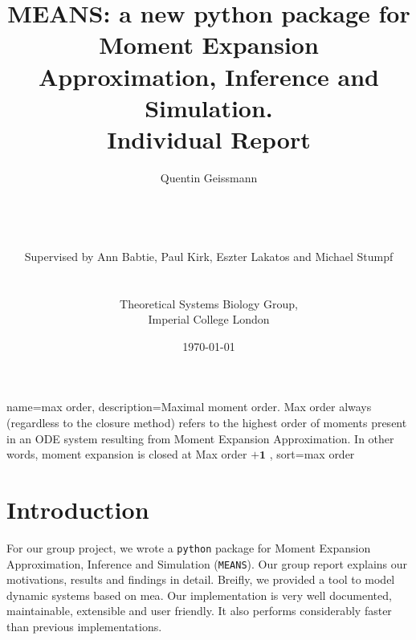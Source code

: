 \documentclass[11pt,a4paper]{article}
\newcommand{\means}{\texttt{MEANS}}
\newcommand{\py}{\texttt{python}}
\begin{document}
\listoftodos
\newpage

\title{MEANS: a new python package for Moment Expansion Approximation, Inference and Simulation.\\
Individual Report\\
}
\author{Quentin Geissmann\\
\\	
\\
\\
\\
Supervised by Ann Babtie, Paul Kirk, Eszter Lakatos and Michael Stumpf\\
\\
\\
Theoretical Systems Biology Group,\\
Imperial College London
}
\date{\today}

\clearpage\maketitle
\thispagestyle{empty}
\newpage{}



\tableofcontents


{
  name=max order,
  description={Maximal moment order. Max order always (regardless to the closure method) refers to the highest order of 
  moments present in an ODE system resulting from Moment Expansion Approximation. In other words, moment expansion is closed at Max order $\mathbf{+1}$
   },
  sort=max order
}

\newpage{}

\section{Introduction}

For our group project, we wrote a \py{} package for Moment Expansion Approximation, Inference and Simulation (\means).
Our group report explains our motivations, results and findings in detail. 
Breifly, we provided a tool to model dynamic systems based on \acrlong{mea}\cite{ale_general_2013}.
Our implementation is very well documented, maintainable, extensible and user friendly.
It also performs considerably faster than previous implementations.
\end{document}
